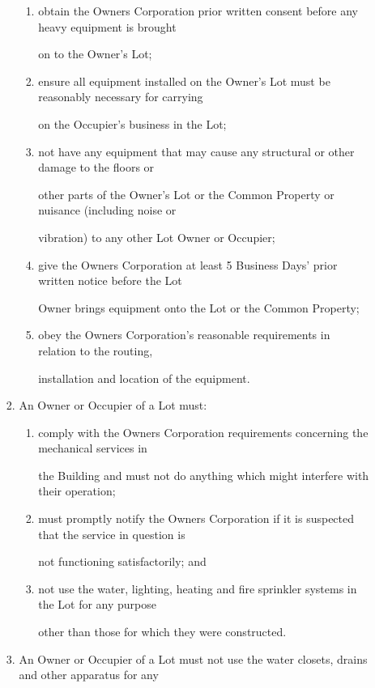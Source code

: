 \documentclass{article}
\begin{document}
\begin{enumerate}[label=\arabic*.]
\begin{enumerate}[label=\arabic{enumi}.\arabic*.]
\begin{enumerate}[label=(\arabic*)]
\begin{enumerate}[label=(\alph*)]
\item  obtain the Owners Corporation prior written consent before any heavy equipment is brought 

on to the Owner’s Lot; 

\item  ensure all equipment installed on the Owner’s Lot must be reasonably necessary for carrying 

on the Occupier’s business in the Lot; 

\item  not have any equipment that may cause any structural or other damage to the floors or 

other parts of the Owner’s Lot or the Common Property or nuisance (including noise or 

vibration) to any other Lot Owner or Occupier; 

\item  give the Owners Corporation at least 5 Business Days’ prior written notice before the Lot 

Owner brings equipment onto the Lot or the Common Property; 

\item  obey the Owners Corporation’s reasonable requirements in relation to the routing, 

installation and location of the equipment. 

\end{enumerate}
\item  An Owner or Occupier of a Lot must: 

\begin{enumerate}[label=(\alph*)]
\item  comply with the Owners Corporation requirements concerning the mechanical services in 

the Building and must not do anything which might interfere with their operation; 

\item  must promptly notify the Owners Corporation if it is suspected that the service in question is 

not functioning satisfactorily; and 

\item  not use the water, lighting, heating and fire sprinkler systems in the Lot for any purpose 

other than those for which they were constructed. 

\end{enumerate}
\item  An Owner or Occupier of a Lot must not use the water closets, drains and other apparatus for any 


\end{enumerate}
\end{enumerate}
\end{enumerate}
\end{document}
